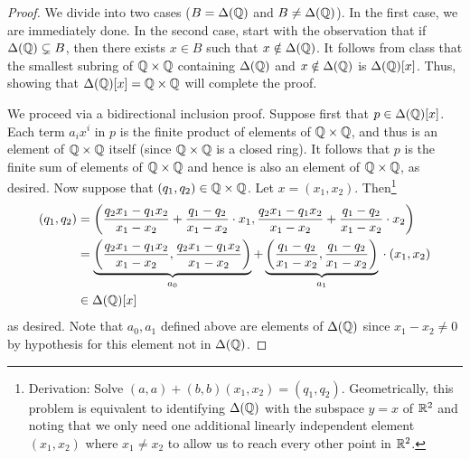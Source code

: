 \documentclass[../psets.tex]{subfiles}
\begin{document}
\begin{enumerate}[resume]
\begin{proof}
        We divide into two cases ($B=\Delta(\mathbb{Q})$ and $B\neq\Delta(\mathbb{Q})$). In the first case, we are immediately done. In the second case, start with the observation that if $\Delta(\mathbb{Q})\subsetneq B$, then there exists $x\in B$ such that $x\notin\Delta(\mathbb{Q})$. It follows from class that the smallest subring of $\mathbb{Q}\times\mathbb{Q}$ containing $\Delta(\mathbb{Q})$ and $x\notin\Delta(\mathbb{Q})$ is $\Delta(\mathbb{Q})[x]$. Thus, showing that $\Delta(\mathbb{Q})[x]=\mathbb{Q}\times\mathbb{Q}$ will complete the proof.\par
        We proceed via a bidirectional inclusion proof. Suppose first that $p\in\Delta(\mathbb{Q})[x]$. Each term $a_ix^i$ in $p$ is the finite product of elements of $\mathbb{Q}\times\mathbb{Q}$, and thus is an element of $\mathbb{Q}\times\mathbb{Q}$ itself (since $\mathbb{Q}\times\mathbb{Q}$ is a closed ring). It follows that $p$ is the finite sum of elements of $\mathbb{Q}\times\mathbb{Q}$ and hence is also an element of $\mathbb{Q}\times\mathbb{Q}$, as desired. Now suppose that $(q_1,q_2)\in\mathbb{Q}\times\mathbb{Q}$. Let $x=(x_1,x_2)$. Then\footnote{Derivation: Solve $(a,a)+(b,b)(x_1,x_2)=(q_1,q_2)$. Geometrically, this problem is equivalent to identifying $\Delta(\mathbb{Q})$ with the subspace $y=x$ of $\mathbb{R}^2$ and noting that we only need one additional linearly independent element $(x_1,x_2)$ where $x_1\neq x_2$ to allow us to reach every other point in $\mathbb{R}^2$.}
        \begin{align*}
            (q_1,q_2) &= \left( \frac{q_2x_1-q_1x_2}{x_1-x_2}+\frac{q_1-q_2}{x_1-x_2}\cdot x_1,\frac{q_2x_1-q_1x_2}{x_1-x_2}+\frac{q_1-q_2}{x_1-x_2}\cdot x_2 \right)\\
            &= \underbrace{\left( \frac{q_2x_1-q_1x_2}{x_1-x_2},\frac{q_2x_1-q_1x_2}{x_1-x_2} \right)}_{a_0}+\underbrace{\left( \frac{q_1-q_2}{x_1-x_2},\frac{q_1-q_2}{x_1-x_2} \right)}_{a_1}\vphantom{)}\cdot(x_1,x_2)\\
            &\in \Delta(\mathbb{Q})[x]
        \end{align*}
        as desired. Note that $a_0,a_1$ defined above are elements of $\Delta(\mathbb{Q})$ since $x_1-x_2\neq 0$ by hypothesis for this element not in $\Delta(\mathbb{Q})$.
    \end{proof}
\end{enumerate}
\end{document}

